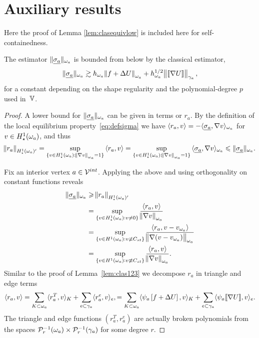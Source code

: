 \documentclass[thesis.tex]{subfiles}
\begin{document}
\section{Auxiliary results}
\label{sec:aux}
Here the proof of Lemma \ref{lem:clasequivlow} is included here  for self-containedness.
  \begin{lemstar}
  The estimator $\| \underline{\sigma_a} \|_{\omega_a}$ is bounded from below by the classical estimator,
  \[
    \| \underline{\sigma_a} \|_{\omega_a} \gtrsim h_{\omega_a}\norm{f + \Delta U}_{\omega_a} + h^{1/2}_{\omega_a} \norm{\llbracket \nabla U  \rrbracket}_{\gamma_a},
  \]
  for a constant depending on the shape regularity and the polynomial-degree $p$ used in~$\mathbb{V}$.
  \end{lemstar}
\begin{proof}
  A lower bound for $\| \underline{\sigma_a} \|_{\omega_a}$ can be given in terms or $r_a$.
  By the definition of the local equilibrium property~\eqref{eq:defsigma} we have $\langle r_a, v \rangle = - \langle \underline{\sigma_a}, \nabla v \rangle_{\omega_a}$ for $v \in H_\star^1(\omega_a)$,
  and thus
  \[
    \norm{r_a}_{H_\star^1(\omega_a)'} = \sup_{\{v \in H_\star^1(\omega_a) : \norm{\nabla v}_{\omega_a} = 1\}} {\langle r_a, v \rangle} = \sup_{\{v \in H_\star^1(\omega_a) : \norm{\nabla v}_{\omega_a}=1\}} {\langle \underline{\sigma_a}, \nabla v \rangle_{\omega_a}} \leqslant \| \underline{\sigma_a} \|_{\omega_a}.
  \]

  Fix an interior vertex  $a \in \mathcal{V}^{int}$. Applying the above and using orthogonality on constant functions reveals  
  \begin{align*}
    \| \underline{\sigma_a} \|_{\omega_a} &\geqslant \norm{r_a}_{H^1_\star(\omega_a)'} \\
    &= \sup_{\{v \in H^1_\star(\omega_a) : v \ne 0\}} { \langle r_a, v \rangle \over \norm{\nabla v}_{\omega_a}} \\
    &= \sup_{\{v \in H^1(\omega_a) : v \not \equiv C_{st}\}} { \langle r_a, v - v_{\omega_a} \rangle \over \norm{\nabla (v - v_{\omega_a})}_{\omega_a}} \\
    &= \sup_{\{v \in H^1(\omega_a) : v \not \equiv C_{st}\}} { \langle r_a, v \rangle \over \norm{\nabla v}_{\omega_a}}.
  \end{align*}
  Similar to the proof of Lemma~\ref{lem:clas123} we decompose $r_a$ in triangle and edge terms
  \[
    \langle r_a,v \rangle = \sum_{K\subset \omega_a} \langle{r^T_a, v}\rangle_K + \sum_{e \subset \gamma_a} \langle r^e_a, v \rangle_e,
    = \sum_{K\subset \omega_a} \langle{\psi_a \left [f+\Delta U \right], v}\rangle_K + \sum_{e \subset \gamma_a} \langle \psi_a \llbracket \nabla U \rrbracket, v \rangle_e.
  \]
  The triangle and edge functions $(r^T_a, r^e_a)$ are actually broken polynomials from the spaces $\mathcal{P}_r^{-1}(\omega_a)\times \mathcal{P}_r^{-1}(\gamma_a)$ for some degree $r$.


\end{proof}
\end{document}
